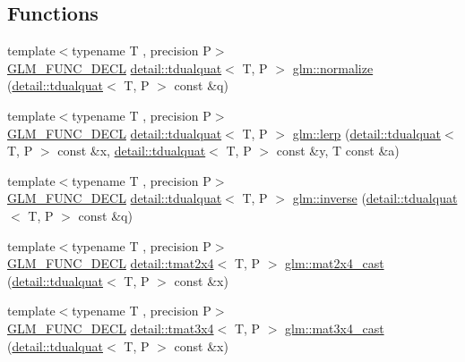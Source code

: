 \subsection*{Functions}
\begin{DoxyCompactItemize}
\item 
{\footnotesize template$<$typename T , precision P$>$ }\\\hyperlink{setup_8hpp_ab2d052de21a70539923e9bcbf6e83a51}{G\+L\+M\+\_\+\+F\+U\+N\+C\+\_\+\+D\+E\+CL} \hyperlink{structglm_1_1detail_1_1tdualquat}{detail\+::tdualquat}$<$ T, P $>$ \hyperlink{group__gtc__dual__quaternion_ga4364d115fe8ee2f65ff047726133d0ad}{glm\+::normalize} (\hyperlink{structglm_1_1detail_1_1tdualquat}{detail\+::tdualquat}$<$ T, P $>$ const \&q)
\item 
{\footnotesize template$<$typename T , precision P$>$ }\\\hyperlink{setup_8hpp_ab2d052de21a70539923e9bcbf6e83a51}{G\+L\+M\+\_\+\+F\+U\+N\+C\+\_\+\+D\+E\+CL} \hyperlink{structglm_1_1detail_1_1tdualquat}{detail\+::tdualquat}$<$ T, P $>$ \hyperlink{group__gtc__dual__quaternion_ga28cbcf029272d5351d4695b8610de126}{glm\+::lerp} (\hyperlink{structglm_1_1detail_1_1tdualquat}{detail\+::tdualquat}$<$ T, P $>$ const \&x, \hyperlink{structglm_1_1detail_1_1tdualquat}{detail\+::tdualquat}$<$ T, P $>$ const \&y, T const \&a)
\item 
{\footnotesize template$<$typename T , precision P$>$ }\\\hyperlink{setup_8hpp_ab2d052de21a70539923e9bcbf6e83a51}{G\+L\+M\+\_\+\+F\+U\+N\+C\+\_\+\+D\+E\+CL} \hyperlink{structglm_1_1detail_1_1tdualquat}{detail\+::tdualquat}$<$ T, P $>$ \hyperlink{group__gtc__dual__quaternion_gaad6b9faeb1134c04defae01426a777f8}{glm\+::inverse} (\hyperlink{structglm_1_1detail_1_1tdualquat}{detail\+::tdualquat}$<$ T, P $>$ const \&q)
\item 
{\footnotesize template$<$typename T , precision P$>$ }\\\hyperlink{setup_8hpp_ab2d052de21a70539923e9bcbf6e83a51}{G\+L\+M\+\_\+\+F\+U\+N\+C\+\_\+\+D\+E\+CL} \hyperlink{structglm_1_1detail_1_1tmat2x4}{detail\+::tmat2x4}$<$ T, P $>$ \hyperlink{group__gtc__dual__quaternion_gade155fb0dfc144259a25897776e73325}{glm\+::mat2x4\+\_\+cast} (\hyperlink{structglm_1_1detail_1_1tdualquat}{detail\+::tdualquat}$<$ T, P $>$ const \&x)
\item 
{\footnotesize template$<$typename T , precision P$>$ }\\\hyperlink{setup_8hpp_ab2d052de21a70539923e9bcbf6e83a51}{G\+L\+M\+\_\+\+F\+U\+N\+C\+\_\+\+D\+E\+CL} \hyperlink{structglm_1_1detail_1_1tmat3x4}{detail\+::tmat3x4}$<$ T, P $>$ \hyperlink{group__gtc__dual__quaternion_ga2f4f0a1275fa95c272dd6ad6df75013d}{glm\+::mat3x4\+\_\+cast} (\hyperlink{structglm_1_1detail_1_1tdualquat}{detail\+::tdualquat}$<$ T, P $>$ const \&x)

\end{DoxyCompactItemize}
